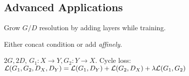 \subsection{Advanced Applications}
\begin{definition}[Grow]
    Grow \(G/D\) resolution by adding layers while training.
\end{definition}

\begin{definition}
    Either concat condition or add \textit{affinely}.
\end{definition}

\begin{definition}
    \(2G, 2D\), \(G_1: X \to Y, G_2: Y \to X\). Cycle loss: \(\mathcal{L}(G_1, G_2, D_X, D_Y) = \mathcal{L}(G_1, D_Y) + \mathcal{L}(G_2, D_X) + \lambda \mathcal{L}(G_1, G_2)\)
\end{definition}

